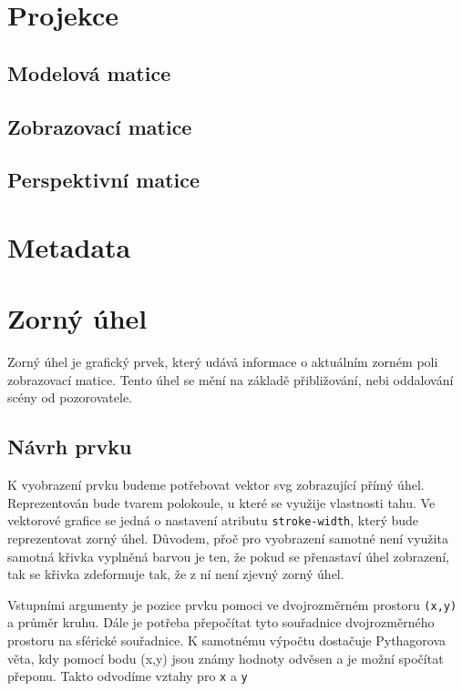 \section{Projekce}
\subsection{Modelová matice}
\subsection{Zobrazovací matice}
\subsection{Perspektivní matice}

\section{Metadata}

\newpage

\section{Zorný úhel}
Zorný úhel je grafický prvek, který udává informace o aktuálním zorném poli zobrazovací matice. Tento úhel se mění na základě přibližování, nebi oddalování scény od pozorovatele. 

\subsection{Návrh prvku}
K vyobrazení prvku budeme potřebovat vektor svg zobrazující přímý úhel. Reprezentován bude tvarem polokoule, u které se využije vlastnosti tahu. Ve vektorové grafice se jedná o nastavení atributu \texttt{stroke-width}, který bude reprezentovat zorný úhel. Důvodem, přoč pro vyobrazení samotné není využita samotná křivka vyplněná barvou je ten, že pokud se přenastaví úhel zobrazení, tak se křivka zdeformuje tak, že z ní není zjevný zorný úhel.

Vstupními argumenty je pozice prvku pomoci ve dvojrozměrném prostoru \texttt{(x,y)} a průměr kruhu. Dále je potřeba přepočítat tyto souřadnice dvojrozměrného prostoru na sférické souřadnice. K samotnému výpočtu dostačuje Pythagorova věta, kdy pomocí bodu (x,y) jsou známy hodnoty odvěsen a je možní spočítat přeponu. Takto odvodíme vztahy pro \texttt{x} a \texttt{y}

